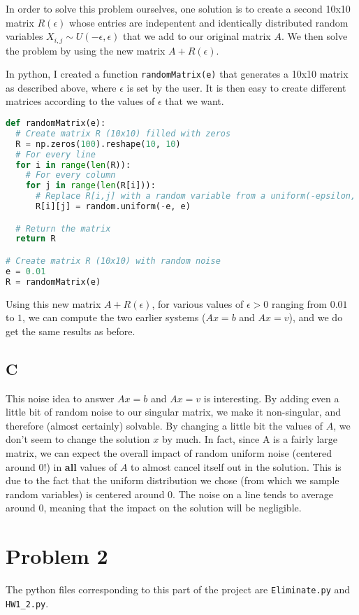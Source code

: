 \documentclass[]{article}
\begin{document}
In order to solve this problem ourselves, one solution is to create a second 10x10 matrix $R(\epsilon)$ whose entries are indepentent and identically distributed random variables $X_{i,j} \sim U(-\epsilon, \epsilon)$ that we add to our original matrix $A$. We then solve the problem by using the new matrix $A + R(\epsilon)$.

In python, I created a function \texttt{randomMatrix(e)} that generates a 10x10 matrix as described above, where $\epsilon$ is set by the user. It is then easy to create different matrices according to the values of $\epsilon$ that we want.

\begin{lstlisting}[language=Python]
def randomMatrix(e):
  # Create matrix R (10x10) filled with zeros
  R = np.zeros(100).reshape(10, 10)
  # For every line
  for i in range(len(R)):
    # For every column
    for j in range(len(R[i])):
      # Replace R[i,j] with a random variable from a uniform(-epsilon, epsilon)
      R[i][j] = random.uniform(-e, e)

  # Return the matrix
  return R

# Create matrix R (10x10) with random noise
e = 0.01
R = randomMatrix(e)
\end{lstlisting}

Using this new matrix $A + R(\epsilon)$, for various values of $\epsilon > 0$ ranging from $0.01$ to $1$, we can compute the two earlier systems ($Ax = b$ and $Ax = v$), and we do get the same results as before.

\subsection*{C}
This noise idea to answer $Ax = b$ and $Ax = v$ is interesting. By adding even a little bit of random noise to our singular matrix, we make it non-singular, and therefore (almost certainly) solvable. By changing a little bit the values of $A$, we don't seem to change the solution $x$ by much. In fact, since A is a fairly large matrix, we can expect the overall impact of random uniform noise (centered around 0!) in \textbf{all} values of $A$ to almost cancel itself out in the solution. This is due to the fact that the uniform distribution we chose (from which we sample random variables) is centered around 0. The noise on a line tends to average around 0, meaning that the impact on the solution will be negligible.

\newpage
\section*{Problem 2}
The python files corresponding to this part of the project are \texttt{Eliminate.py} and \texttt{HW1\_2.py}.
\end{document}
